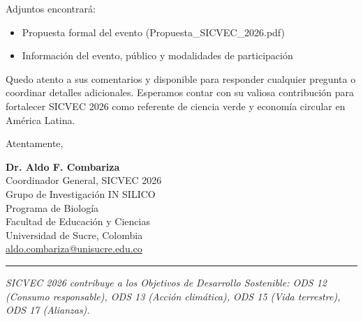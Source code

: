 \documentclass[12pt,a4paper]{article}
\begin{document}
\vspace{0.3cm}

Adjuntos encontrará:
\begin{itemize}
  \item Propuesta formal del evento (Propuesta\_SICVEC\_2026.pdf)
  \item Información del evento, público y modalidades de participación
\end{itemize}

\vspace{0.3cm}

Quedo atento a sus comentarios y disponible para responder cualquier pregunta o coordinar detalles adicionales. Esperamos contar con su valiosa contribución para fortalecer SICVEC 2026 como referente de ciencia verde y economía circular en América Latina.

\vspace{0.4cm}

Atentamente,

\vspace{0.4cm}

\textbf{Dr. Aldo F. Combariza}\\
Coordinador General, SICVEC 2026\\
Grupo de Investigación IN SILICO\\
Programa de Biología\\
Facultad de Educación y Ciencias\\
Universidad de Sucre, Colombia\\
\href{mailto:aldo.combariza@unisucre.edu.co}{aldo.combariza@unisucre.edu.co}

\vspace{0.4cm}

\noindent
\rule{\textwidth}{0.5pt}

\vspace{0.5cm}

\noindent
\textit{\small SICVEC 2026 contribuye a los Objetivos de Desarrollo Sostenible: ODS 12 (Consumo responsable), ODS 13 (Acción climática), ODS 15 (Vida terrestre), ODS 17 (Alianzas).}
\end{document}
